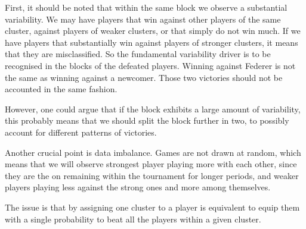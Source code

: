 \documentclass[11pt]{amsart}
\begin{document}
First, it should be noted that within the same block we observe a substantial variability. We may have players that win against other players of the same cluster, against players of weaker clusters, or that simply do not win much. If we have players that substantially win against players of stronger clusters, it means that they are misclassified. So the fundamental variability driver is to be recognised in the blocks of the defeated players. Winning against Federer is not the same as winning against a newcomer. Those two victories should not be accounted in the same fashion.

However, one could argue that if the block exhibits a large amount of variability, this probably means that we should split the block further in two, to possibly account for different patterns of victories.

Another crucial point is data imbalance. Games are not drawn at random, which means that we will observe strongest player playing more with each other, since they are the on remaining within the tournament for longer periods, and weaker players playing less against the strong ones and more among themselves.

The issue is that by assigning one cluster to a player is equivalent to equip them with a single probability to beat all the players within a given cluster.
\end{document}

